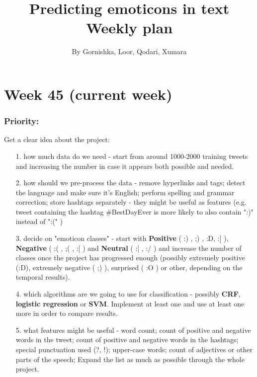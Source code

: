 \documentclass{article}
\begin{document}
\title{Predicting emoticons in text \\ Weekly plan}

\author{By Gornishka, Loor, Qodari, Xumara}
\maketitle

\section*{Week 45 (current week)}

\subsubsection*{Priority:} 
Get a clear idea about the project: 

\begin{itemize}
\item[1.] how much data do we need - start from around 1000-2000 training tweets and increasing the number in case it appears both possible and needed.   \\
\item[2.] how should we pre-process the data - remove hyperlinks and tags; detect the language and make sure it's English; perform spelling and grammar correction; store hashtags separately - they might be useful as features (e.g. tweet containing the hashtag \#BestDayEver is more likely to also contain ":)" instead of ":(" ) \\
\item[3.] decide on "emoticon classes" - start with \textbf{Positive} ( :) , ;) , :D, :] ), \textbf{Negative} ( :( , ;( , :[ ) and \textbf{Neutral} ( :| , :/ ) and increase the number of classes once the project has progressed enough (possibly extremely positive (:D), extremely negative ( ;) ), surprised ( :O ) or other, depending on the temporal results). \\
\item[4.] which algorithms are we going to use for classification - possibly \textbf{CRF}, \textbf{logistic regression} or \textbf{SVM}. Implement at least one and use at least one more in order to compare results. \\
\item[5.] what features might be useful - word count; count of positive and negative words in the tweet; count of positive and negative words in the hashtags; special punctuation used (?, !); upper-case words; count of adjectives or other parts of the speech; Expand the list as much as possible through the whole project.  
\end{itemize}
\end{document}
